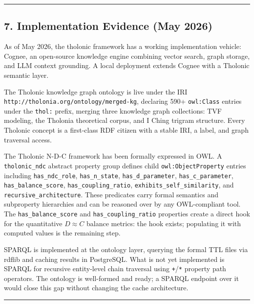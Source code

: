 \documentclass[
  11pt,
  letterpaper,
]{article}
\begin{document}
\begin{center}\rule{0.5\linewidth}{0.5pt}\end{center}

\subsection{7. Implementation Evidence (May
2026)}\label{implementation-evidence-may-2026}

As of May 2026, the tholonic framework has a working implementation
vehicle: Cognee, an open-source knowledge engine combining vector
search, graph storage, and LLM context grounding. A local deployment
extends Cognee with a Tholonic semantic layer.

The Tholonic knowledge graph ontology is live under the IRI
\texttt{http://tholonia.org/ontology/merged-kg}, declaring 590+
\texttt{owl:Class} entries under the \texttt{thol:} prefix, merging
three knowledge graph collections: TVF modeling, the Tholonia
theoretical corpus, and I Ching trigram structure. Every Tholonic
concept is a first-class RDF citizen with a stable IRI, a label, and
graph traversal access.

The Tholonic N-D-C framework has been formally expressed in OWL. A
\texttt{tholonic\_ndc} abstract property group defines child
\texttt{owl:ObjectProperty} entries including \texttt{has\_ndc\_role},
\texttt{has\_n\_state}, \texttt{has\_d\_parameter},
\texttt{has\_c\_parameter}, \texttt{has\_balance\_score},
\texttt{has\_coupling\_ratio}, \texttt{exhibits\_self\_similarity}, and
\texttt{recursive\_architecture}. These predicates carry formal
semantics and subproperty hierarchies and can be reasoned over by any
OWL-compliant tool. The \texttt{has\_balance\_score} and
\texttt{has\_coupling\_ratio} properties create a direct hook for the
quantitative \(D \approx C\) balance metrics: the hook exists;
populating it with computed values is the remaining step.

SPARQL is implemented at the ontology layer, querying the formal TTL
files via rdflib and caching results in PostgreSQL. What is not yet
implemented is SPARQL for recursive entity-level chain traversal using
\texttt{+}/\texttt{*} property path operators. The ontology is
well-formed and ready; a SPARQL endpoint over it would close this gap
without changing the cache architecture.

\begin{center}\rule{0.5\linewidth}{0.5pt}\end{center}
\end{document}
